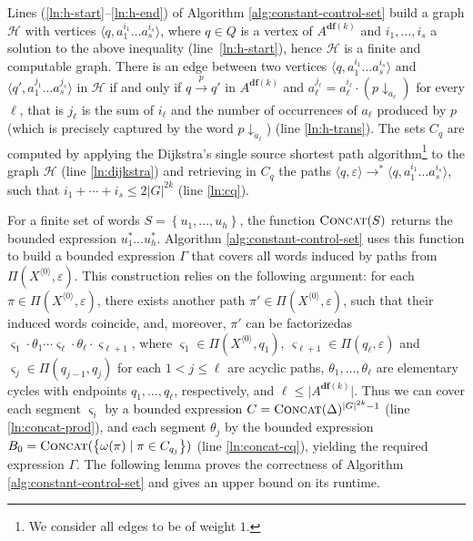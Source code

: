 \documentclass[final]{llncs}
\newcommand{\arrow}[2]{\xrightarrow{{\scriptscriptstyle #1}}}
\def\set#1{{\left\{ #1 \right\}}}
\def\tuple#1{{\langle #1 \rangle}}
\def\len#1{{\vert{#1}\vert}}
\def\prod{\Delta}
\def\df#1{\scriptscriptstyle\mathbf{df}(#1)}
\def\proj{\mathbin{\downarrow}}
\renewcommand{\proj}[2]{{#1}\mathclose{\downarrow}_{{#2}}}
\begin{document}
Lines (\ref{ln:h-start}--\ref{ln:h-end}) of Algorithm
\ref{alg:constant-control-set} build a graph $\mathcal{H}$
with vertices $\tuple{q,a_1^{i_1} \ldots a_s^{i_s}}$, where $q \in Q$
is a vertex of $A^{\df{k}}$ and \(i_1,\ldots,i_s\) a solution to the
above inequality (line~\ref{ln:h-start}), hence \(\mathcal{H}\) is a
finite and computable graph. There is an edge between two vertices
$\tuple{q,a_1^{i_1} \ldots a_s^{i_s}}$ and $\tuple{q',a_1^{j_1} \ldots
a_s^{j_s}}$ in $\mathcal{H}$ if and only if $q \arrow{p}{} q'$ in
$A^{\df{k}}$ and $a_{\ell}^{j_{\ell}} = a_{\ell}^{i_{\ell}} \cdot
(\proj{p}{a_{\ell}})$ for every \(\ell\), that is \(j_{\ell}\) is the
sum of \(i_{\ell}\) and the number of occurrences of \(a_{\ell}\)
produced by \(p\) (which is precisely captured by the
word \(\proj{p}{a_{\ell}}\)) (line \ref{ln:h-trans}). The sets $C_q$
are computed by applying the Dijkstra's single source shortest path
algorithm\footnote{We consider all edges to be of weight \(1\).}  to
the graph $\mathcal{H}$ (line \ref{ln:dijkstra}) and retrieving
in \(C_q\) the paths \(\tuple{q,\varepsilon} \rightarrow^* \tuple{q,a_1^{i_1} \ldots
a_s^{i_s}}\), such that \(i_1 + \cdots + i_s \leq 2\len{G}^{2k} \)
(line \ref{ln:cq}).

For a finite set of words \(S=\set{u_1,\ldots,u_h}\), the function
\(\Call{Concat}{S}\) returns the bounded expression \(u_1^* \ldots u_h^*\).
Algorithm \ref{alg:constant-control-set} uses this function to build a
bounded expression $\Gamma$ that covers all words induced by paths
from \(\Pi(X^\tuple{0},\varepsilon)\). This construction relies on the
following argument: for each $\pi\in\Pi(X^\tuple{0},\varepsilon)$, there
exists another path $\pi'\in\Pi(X^\tuple{0},\varepsilon)$, such that
their induced words coincide, and, moreover, $\pi'$ can be
factorizedas
$\varsigma_1 \cdot \theta_1 \cdots \varsigma_\ell \cdot \theta_\ell \cdot \varsigma_{\ell+1}$,
where \(\varsigma_1 \in \Pi(X^{\tuple{0}},q_1)\), \(\varsigma_{\ell+1} \in \Pi(q_\ell,
\varepsilon)\) and \(\varsigma_{j} \in \Pi(q_{j-1},q_{j})\) for each \(1<
j \leq \ell\) are acyclic paths, $\theta_1, \ldots, \theta_\ell$ are
elementary cycles with endpoints $q_{1}, \ldots, q_{\ell}$, respectively,
and $\ell \leq \len{A^{\df{k}}}$. Thus we can cover each segment
$\varsigma_i$ by a bounded expression $C=\Call{Concat}{\prod}^{\len{G}^{2k}-1}$
(line \ref{ln:concat-prod}), and each segment $\theta_j$ by the
bounded expression \(B_0=\Call{Concat}{\set{\omega(\pi) \mid \pi \in
C_{q_j}}}\) (line \ref{ln:concat-cq}), yielding the required
expression $\Gamma$. The following lemma proves the correctness of
Algorithm \ref{alg:constant-control-set} and gives an upper bound on its runtime.
\end{document}
